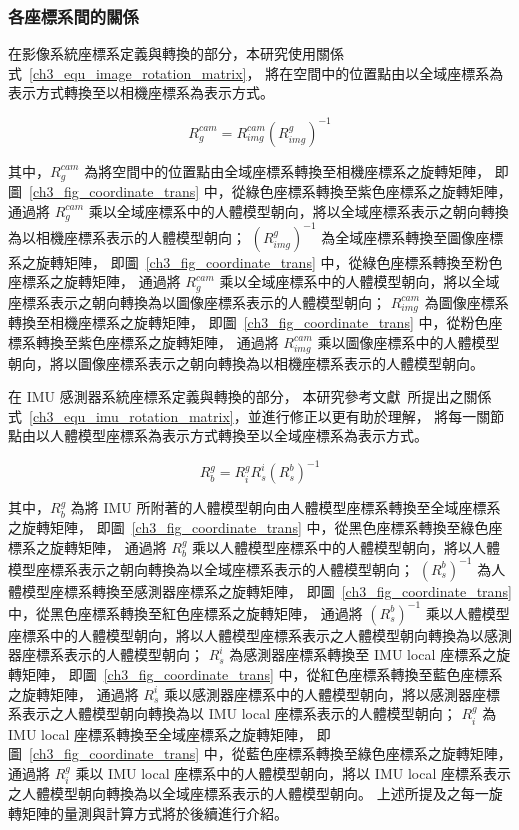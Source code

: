 \subsubsection{各座標系間的關係}
在影像系統座標系定義與轉換的部分，本研究使用關係式~\ref{ch3_equ_image_rotation_matrix}，
將在空間中的位置點由以全域座標系為表示方式轉換至以相機座標系為表示方式。

\begin{equation}
   R^{cam}_{g} = R^{cam}_{img}(R^{g}_{img})^{-1}
   \label{ch3_equ_image_rotation_matrix}
\end{equation}

其中，$R^{cam}_g$ 為將空間中的位置點由全域座標系轉換至相機座標系之旋轉矩陣，
即圖~\ref{ch3_fig_coordinate_trans} 中，從綠色座標系轉換至紫色座標系之旋轉矩陣，
通過將 $R^{cam}_g$ 乘以全域座標系中的人體模型朝向，將以全域座標系表示之朝向轉換為以相機座標系表示的人體模型朝向；
$(R^{g}_{img})^{-1}$ 為全域座標系轉換至圖像座標系之旋轉矩陣，
即圖~\ref{ch3_fig_coordinate_trans} 中，從綠色座標系轉換至粉色座標系之旋轉矩陣，
通過將 $R^{cam}_g$ 乘以全域座標系中的人體模型朝向，將以全域座標系表示之朝向轉換為以圖像座標系表示的人體模型朝向；
$R^{cam}_{img}$ 為圖像座標系轉換至相機座標系之旋轉矩陣，
即圖~\ref{ch3_fig_coordinate_trans} 中，從粉色座標系轉換至紫色座標系之旋轉矩陣，
通過將 $R^{cam}_{img}$ 乘以圖像座標系中的人體模型朝向，將以圖像座標系表示之朝向轉換為以相機座標系表示的人體模型朝向。

在 IMU 感測器系統座標系定義與轉換的部分，
本研究參考文獻~\cite{malleson2017real}所提出之關係式~\ref{ch3_equ_imu_rotation_matrix}，並進行修正以更有助於理解，
將每一關節點由以人體模型座標系為表示方式轉換至以全域座標系為表示方式。

\begin{equation}
   R^g_b=R^g_iR^i_s(R^b_s)^{-1}
   \label{ch3_equ_imu_rotation_matrix}
\end{equation}

其中，$R^g_b$ 為將 IMU 所附著的人體模型朝向由人體模型座標系轉換至全域座標系之旋轉矩陣，
即圖~\ref{ch3_fig_coordinate_trans} 中，從黑色座標系轉換至綠色座標系之旋轉矩陣，
通過將 $R^g_b$ 乘以人體模型座標系中的人體模型朝向，將以人體模型座標系表示之朝向轉換為以全域座標系表示的人體模型朝向；
$(R^b_s)^{-1}$ 為人體模型座標系轉換至感測器座標系之旋轉矩陣，
即圖~\ref{ch3_fig_coordinate_trans} 中，從黑色座標系轉換至紅色座標系之旋轉矩陣，
通過將 $(R^b_s)^{-1}$ 乘以人體模型座標系中的人體模型朝向，將以人體模型座標系表示之人體模型朝向轉換為以感測器座標系表示的人體模型朝向；
$R^i_s$ 為感測器座標系轉換至 IMU local 座標系之旋轉矩陣，
即圖~\ref{ch3_fig_coordinate_trans} 中，從紅色座標系轉換至藍色座標系之旋轉矩陣，
通過將 $R^i_s$ 乘以感測器座標系中的人體模型朝向，將以感測器座標系表示之人體模型朝向轉換為以 IMU local 座標系表示的人體模型朝向；
$R^g_i$ 為 IMU local 座標系轉換至全域座標系之旋轉矩陣，
即圖~\ref{ch3_fig_coordinate_trans} 中，從藍色座標系轉換至綠色座標系之旋轉矩陣，
通過將 $R^g_i$ 乘以 IMU local 座標系中的人體模型朝向，將以 IMU local 座標系表示之人體模型朝向轉換為以全域座標系表示的人體模型朝向。
上述所提及之每一旋轉矩陣的量測與計算方式將於後續進行介紹。

